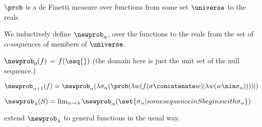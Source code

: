 $\prob$ is a de Finetti measure over functions from some set $\universe$ to the reals

We inductively define $\newprob_{\alpha}$, over the functions to the reals from the set of $\alpha$-sequences of members of $\universe$.

$\newprob_0(f)$ = $f(\seq{})$ (the domain here is just the unit set of the null sequence.)

$\newprob_{\alpha+1}(f) = \newprob_\alpha(\lambda \sigma_\alpha(\prob(\lambda w(f(\sigma \concatenate w)|\lambda w(w \nin \sigma_\alpha))))|)$

$\newprob_\lambda (S) = \lim_{\alpha \rightarrow \lambda} \newprob_\alpha (\set{\sigma_\alpha|some sequence in S begins with \sigma_\alpha})$

extend $\newprob_\lambda$ to general functions in the usual way.

